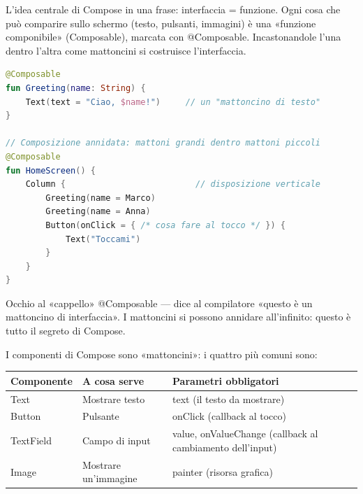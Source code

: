 


L'idea centrale di Compose in una frase: interfaccia = funzione. Ogni cosa che può comparire sullo schermo (testo, pulsanti, immagini) è una «funzione componibile» (Composable), marcata con @Composable. Incastonandole l'una dentro l'altra come mattoncini si costruisce l'interfaccia.

\begin{lstlisting}[language=Kotlin]
@Composable
fun Greeting(name: String) {
    Text(text = "Ciao, $name!")     // un "mattoncino di testo"
}

// Composizione annidata: mattoni grandi dentro mattoni piccoli
@Composable
fun HomeScreen() {
    Column {                          // disposizione verticale
        Greeting(name = Marco)
        Greeting(name = Anna)
        Button(onClick = { /* cosa fare al tocco */ }) {
            Text("Toccami")
        }
    }
}
\end{lstlisting}

Occhio al «cappello» @Composable — dice al compilatore «questo è un mattoncino di interfaccia». I mattoncini si possono annidare all'infinito: questo è tutto il segreto di Compose.


I componenti di Compose sono «mattoncini»: i quattro più comuni sono:

\begin{center}
\begin{tabularx}{\linewidth}{|X|X|X|}
\hline
\textbf{Componente} & \textbf{A cosa serve} & \textbf{Parametri obbligatori} \tabularnewline
\hline
Text & Mostrare testo & text (il testo da mostrare) \tabularnewline
Button & Pulsante & onClick (callback al tocco) \tabularnewline
TextField & Campo di input & value, onValueChange (callback al cambiamento dell'input) \tabularnewline
Image & Mostrare un'immagine & painter (risorsa grafica) \tabularnewline
\hline
\end{tabularx}
\end{center}

